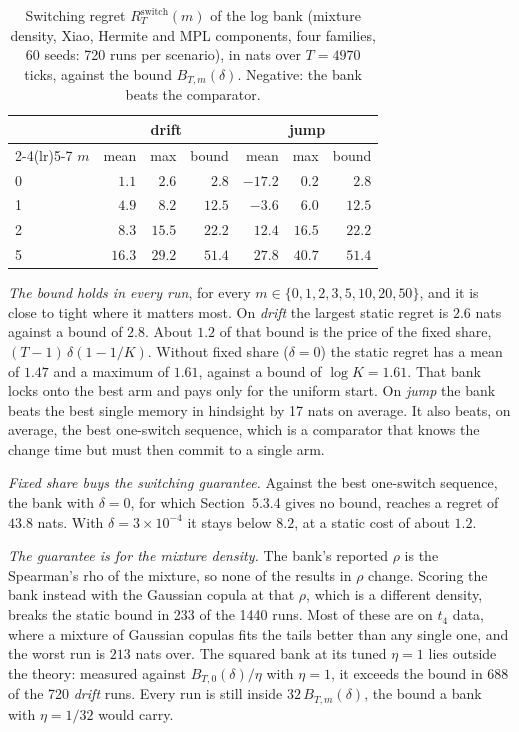 \begin{table}[ht]
  \centering
  \caption{Switching regret $R^{\mathrm{switch}}_T(m)$ of the log bank (mixture density, Xiao,
    Hermite and MPL components, four families, 60 seeds: 720 runs per scenario), in nats over
    $T=4970$ ticks, against the bound $B_{T,m}(\delta)$. Negative: the bank beats the comparator.}
  \label{tab:regret}
  \small
  \begin{tabular}{lrrrrrr}
    \toprule
    & \multicolumn{3}{c}{drift} & \multicolumn{3}{c}{jump} \\
    \cmidrule(lr){2-4}\cmidrule(lr){5-7}
    $m$ & mean & max & bound & mean & max & bound \\
    \midrule
    0 & $1.1$  & $2.6$  & $2.8$  & $-17.2$ & $0.2$  & $2.8$ \\
    1 & $4.9$  & $8.2$  & $12.5$ & $-3.6$  & $6.0$  & $12.5$ \\
    2 & $8.3$  & $15.5$ & $22.2$ & $12.4$  & $16.5$ & $22.2$ \\
    5 & $16.3$ & $29.2$ & $51.4$ & $27.8$  & $40.7$ & $51.4$ \\
    \bottomrule
  \end{tabular}
\end{table}

\emph{The bound holds in every run}, for every $m\in\{0,1,2,3,5,10,20,50\}$, and it is close to
tight where it matters most. On \emph{drift} the largest static regret is $2.6$ nats against a
bound of $2.8$. About $1.2$ of that bound is the price of the fixed share,
$(T-1)\,\delta(1-1/K)$. Without fixed share ($\delta=0$) the static regret has a mean of $1.47$ and
a maximum of $1.61$, against a bound of $\log K=1.61$. That bank locks onto the best arm and pays
only for the uniform start. On \emph{jump} the bank beats the best single memory in hindsight by
17 nats on average. It also beats, on average, the best one-switch sequence, which is a comparator
that knows the change time but must then commit to a single arm.

\emph{Fixed share buys the switching guarantee.} Against the best one-switch sequence, the bank
with $\delta=0$, for which Section~5.3.4 gives no bound, reaches a regret of $43.8$ nats. With
$\delta=3\times10^{-4}$ it stays below $8.2$, at a static cost of about $1.2$.

\emph{The guarantee is for the mixture density.} The bank's reported $\rho$ is the Spearman's rho
of the mixture, so none of the results in $\rho$ change. Scoring the bank instead with the Gaussian
copula at that $\rho$, which is a different density, breaks the static bound in 233 of the 1440
runs. Most of these are on $t_4$ data, where a mixture of Gaussian copulas fits the tails better
than any single one, and the worst run is $213$ nats over. The squared bank at its tuned $\eta=1$
lies outside the theory: measured against $B_{T,0}(\delta)/\eta$ with $\eta=1$, it exceeds the
bound in 688 of the 720 \emph{drift} runs. Every run is still inside $32\,B_{T,m}(\delta)$, the
bound a bank with $\eta=1/32$ would carry.

